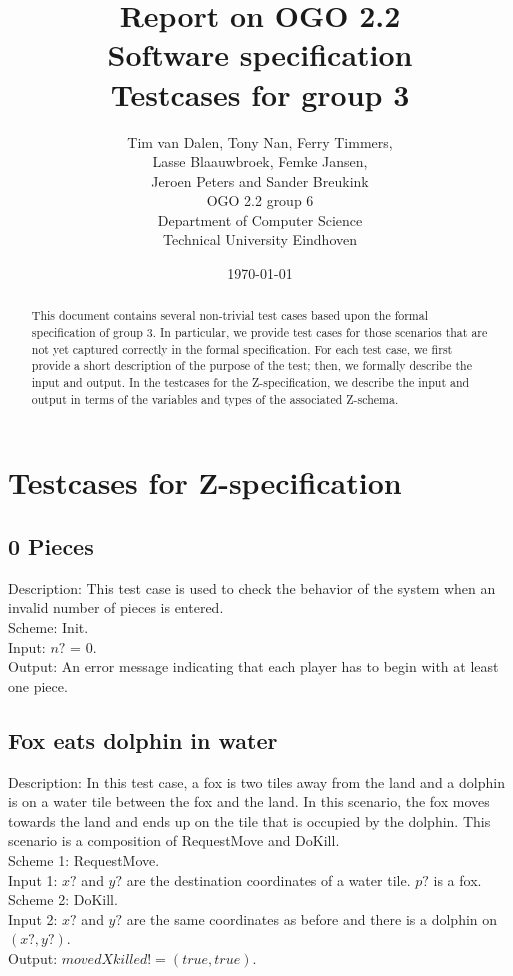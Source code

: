 \documentclass[a4paper,11pt]{article}
\title{Report on OGO 2.2 \\ Software specification\\ Testcases for group 3}
\author{
        Tim van Dalen, Tony Nan, Ferry Timmers, \\ Lasse Blaauwbroek, Femke Jansen, \\Jeroen Peters and Sander Breukink\\ OGO 2.2 group 6 \\
                Department of Computer Science\\
        Technical University Eindhoven\\
}
\date{\today}
\begin{document}
\maketitle

\begin{abstract}
This document contains several non-trivial test cases based upon the formal specification of group 3. In particular, we provide test cases for those scenarios that are not yet captured correctly in the formal specification. For each test case, we first provide a short description of the purpose of the test; then, we formally describe the input and output. In the testcases for the Z-specification, we describe the input and output in terms of the variables and types of the associated Z-schema.
\end{abstract}

    \section{Testcases for Z-specification}

\subsection{0 Pieces}
    Description: This test case is used to check the behavior of the system when an invalid number of pieces is entered. \\
    Scheme: Init.\\
    Input: $n?$ = 0.\\
    Output: An error message indicating that each player has to begin with at least one piece.

\subsection{Fox eats dolphin in water}
    Description: In this test case, a fox is two tiles away from the land and a dolphin is on a water tile between the fox and the land. In this scenario, the fox moves towards the land and ends up on the tile that is occupied by the dolphin. This scenario is a composition of RequestMove and DoKill. \\
    Scheme 1: RequestMove.\\
    Input 1: $x?$ and $y?$ are the destination coordinates of a water tile. $p?$ is a fox.\\
    Scheme 2: DoKill.\\
    Input 2: $x?$ and $y?$ are the same coordinates as before and there is a dolphin on $(x?,y?)$.\\
    Output: $movedXkilled! = (true,true)$.\\
\end{document}

